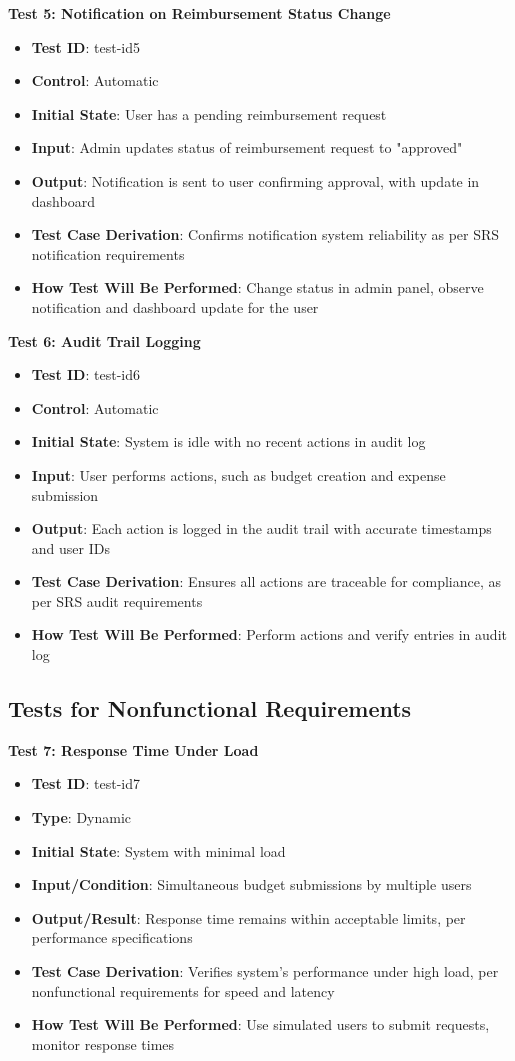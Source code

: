 \documentclass[12pt, titlepage]{article}
\begin{document}
\textbf{Test 5: Notification on Reimbursement Status Change}
\begin{itemize}
    \item \textbf{Test ID}: test-id5
    \item \textbf{Control}: Automatic
    \item \textbf{Initial State}: User has a pending reimbursement request
    \item \textbf{Input}: Admin updates status of reimbursement request to "approved"
    \item \textbf{Output}: Notification is sent to user confirming approval, with update in dashboard
    \item \textbf{Test Case Derivation}: Confirms notification system reliability as per SRS notification requirements
    \item \textbf{How Test Will Be Performed}: Change status in admin panel, observe notification and dashboard update for the user
\end{itemize}
\textbf{Test 6: Audit Trail Logging}
\begin{itemize}
    \item \textbf{Test ID}: test-id6
    \item \textbf{Control}: Automatic
    \item \textbf{Initial State}: System is idle with no recent actions in audit log
    \item \textbf{Input}: User performs actions, such as budget creation and expense submission
    \item \textbf{Output}: Each action is logged in the audit trail with accurate timestamps and user IDs
    \item \textbf{Test Case Derivation}: Ensures all actions are traceable for compliance, as per SRS audit requirements
    \item \textbf{How Test Will Be Performed}: Perform actions and verify entries in audit log
\end{itemize}

\subsection{Tests for Nonfunctional Requirements}

\textbf{Test 7: Response Time Under Load}
\begin{itemize}
    \item \textbf{Test ID}: test-id7
    \item \textbf{Type}: Dynamic
    \item \textbf{Initial State}: System with minimal load
    \item \textbf{Input/Condition}: Simultaneous budget submissions by multiple users
    \item \textbf{Output/Result}: Response time remains within acceptable limits, per performance specifications
    \item \textbf{Test Case Derivation}: Verifies system’s performance under high load, per nonfunctional requirements for speed and latency
    \item \textbf{How Test Will Be Performed}: Use simulated users to submit requests, monitor response times
\end{itemize}
\end{document}
